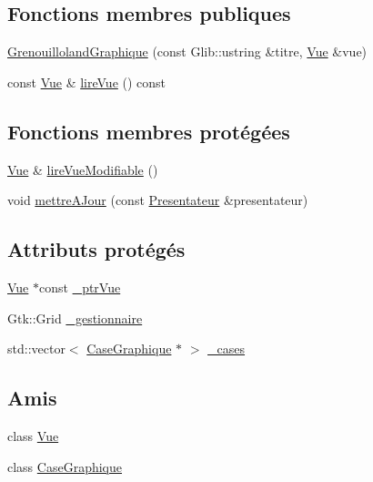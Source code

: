 \subsection*{Fonctions membres publiques}
\begin{DoxyCompactItemize}
\item 
\hyperlink{classgrenouilloland_1_1GrenouillolandGraphique_a97d352b5fdf2875f4d86d68c86579547}{Grenouilloland\-Graphique} (const Glib\-::ustring \&titre, \hyperlink{classgrenouilloland_1_1Vue}{Vue} \&vue)
\item 
const \hyperlink{classgrenouilloland_1_1Vue}{Vue} \& \hyperlink{classgrenouilloland_1_1GrenouillolandGraphique_a7b19495a473e950ed6ff6e9b3d307abc}{lire\-Vue} () const 
\end{DoxyCompactItemize}
\subsection*{Fonctions membres protégées}
\begin{DoxyCompactItemize}
\item 
\hyperlink{classgrenouilloland_1_1Vue}{Vue} \& \hyperlink{classgrenouilloland_1_1GrenouillolandGraphique_a077a9aa314172f04d4fecee498c5a37a}{lire\-Vue\-Modifiable} ()
\item 
void \hyperlink{classgrenouilloland_1_1GrenouillolandGraphique_a456350eac30419edfab5a9e37d49da1b}{mettre\-A\-Jour} (const \hyperlink{classgrenouilloland_1_1Presentateur}{Presentateur} \&presentateur)
\end{DoxyCompactItemize}
\subsection*{Attributs protégés}
\begin{DoxyCompactItemize}
\item 
\hyperlink{classgrenouilloland_1_1Vue}{Vue} $\ast$const \hyperlink{classgrenouilloland_1_1GrenouillolandGraphique_aa0fe0c7d9e9cd676b8ce62a40ab97c62}{\-\_\-ptr\-Vue}
\item 
Gtk\-::\-Grid \hyperlink{classgrenouilloland_1_1GrenouillolandGraphique_a71036819a9bba19e6ecee48cf7acc00b}{\-\_\-gestionnaire}
\item 
std\-::vector$<$ \hyperlink{classgrenouilloland_1_1CaseGraphique}{Case\-Graphique} $\ast$ $>$ \hyperlink{classgrenouilloland_1_1GrenouillolandGraphique_ab4d1dbe72f42279511f2ccbd171bbffe}{\-\_\-cases}
\end{DoxyCompactItemize}
\subsection*{Amis}
\begin{DoxyCompactItemize}
\item 
class \hyperlink{classgrenouilloland_1_1GrenouillolandGraphique_adc3b1810b8d3988a7832f57c330fe4fd}{Vue}
\item 
class \hyperlink{classgrenouilloland_1_1GrenouillolandGraphique_ac12b0ba9ebe667c8408ac35bf21598e8}{Case\-Graphique}
\end{DoxyCompactItemize}


